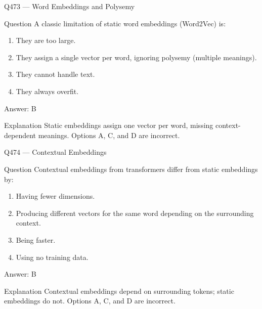 \documentclass[aspectratio=169,8pt]{beamer}
\begin{document}
	\begin{frame}{Q473 --- Word Embeddings and Polysemy}
		\begin{block}{Question}
			A classic limitation of static word embeddings (Word2Vec) is:
			\begin{enumerate}
				\item They are too large.
				\item They assign a single vector per word, ignoring polysemy (multiple meanings).
				\item They cannot handle text.
				\item They always overfit.
			\end{enumerate}
		\end{block}
		\begin{exampleblock}{Answer: B}\end{exampleblock}
		\begin{block}{Explanation}
			Static embeddings assign one vector per word, missing context-dependent meanings. Options A, C, and D are incorrect.
		\end{block}
	\end{frame}
	
	\begin{frame}{Q474 --- Contextual Embeddings}
		\begin{block}{Question}
			Contextual embeddings from transformers differ from static embeddings by:
			\begin{enumerate}
				\item Having fewer dimensions.
				\item Producing different vectors for the same word depending on the surrounding context.
				\item Being faster.
				\item Using no training data.
			\end{enumerate}
		\end{block}
		\begin{exampleblock}{Answer: B}\end{exampleblock}
		\begin{block}{Explanation}
			Contextual embeddings depend on surrounding tokens; static embeddings do not. Options A, C, and D are incorrect.
		\end{block}
	\end{frame}
	
\end{document}
